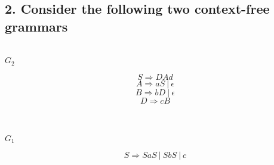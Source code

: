 \documentclass[a4paper, 14pt]{report}
\newcommand{\question}[1]{\subsection*{#1}}
\begin{document}
\question{2. Consider the following two context-free grammars}

\begin{multicols}{2}
	\begin{center} \textbf{\\$G_{2}$} \end{center}

	\[ S \Rightarrow DAd \]
	\[ A \Rightarrow aS\ |\ \epsilon \]
	\[ B \Rightarrow bD\ |\ \epsilon \]
	\[ D \Rightarrow cB \]

	\begin{center} \textbf{\\\\$G_{1}$} \end{center}

	\[ S \Rightarrow SaS\ |\ SbS\ |\ c \] \\
\end{multicols}
\end{document}

